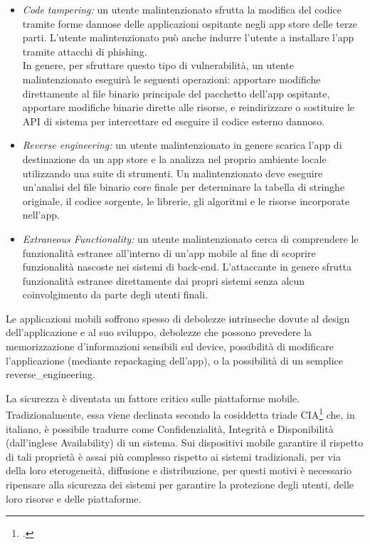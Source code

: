 \begin{itemize}
    \item \textit{Code tampering:}
    un utente malintenzionato sfrutta la modifica del codice tramite forme dannose delle applicazioni ospitante negli app store delle terze parti.
    L'utente malintenzionato può anche indurre l'utente a installare l'app tramite attacchi di phishing.\\
    In genere, per sfruttare questo tipo di vulnerabilità, un utente malintenzionato eseguirà le seguenti operazioni: apportare modifiche direttamente al file binario principale del pacchetto dell'app ospitante, apportare modifiche binarie dirette alle risorse, e reindirizzare o sostituire le API di sistema per intercettare ed eseguire il codice esterno dannoso.

    \item \textit{Reverse engineering:}
    un utente malintenzionato in genere scarica l'app di destinazione da un app store e la analizza nel proprio ambiente locale utilizzando una suite di strumenti.
    Un malintenzionato deve eseguire un'analisi del file binario core finale per determinare la tabella di stringhe originale, il codice sorgente, le librerie, gli algoritmi e le risorse incorporate nell'app.
    \item \textit{Extraneous Functionality:}
    un utente malintenzionato cerca di comprendere le funzionalità estranee all'interno di un'app mobile  al fine di scoprire funzionalità nascoste nei sistemi di back-end.
    L'attaccante in genere sfrutta funzionalità estranee direttamente dai propri sistemi senza alcun coinvolgimento da parte degli utenti finali.
\end{itemize}
Le applicazioni mobili soffrono spesso di debolezze intrinseche dovute al design dell'applicazione e al suo sviluppo, debolezze che possono prevedere la memorizzazione d'informazioni sensibili sul device, possibilità di modificare l'applicazione (mediante \gls{repackaging} dell'app), o la possibilità di un semplice \gls{reverse_engineering}.

La sicurezza è diventata un fattore critico sulle piattaforme mobile.
Tradizionalmente, essa viene declinata secondo la cosiddetta triade CIA\footcite{samonas2014cia} che, in italiano, è possibile tradurre come Confidenzialità, Integrità e Disponibilità (dall'inglese Availability) di un sistema.
Sui dispositivi mobile garantire il rispetto di tali proprietà è assai più complesso rispetto ai sistemi tradizionali, per via della loro eterogeneità, diffusione e distribuzione, per questi motivi è necessario ripensare alla sicurezza dei sistemi per garantire la protezione degli utenti, delle loro risorse e delle piattaforme.

